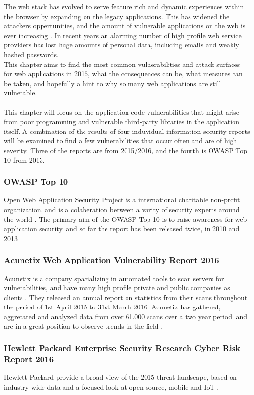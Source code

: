 The web stack has evolved to serve feature rich and dynamic experiences within the browser by expanding on the legacy applications. This has widened the attackers oppertunities, and the amount of vulnerable applications on the web is ever increasing \cite{Acunetix2016}. In recent years an alarming number of high profile web service providers has lost huge amounts of personal data, including emails and weakly hashed passwords. \\ This chapter aims to find the most common vulnerabilities and attack surfaces for web applications in 2016, what the consequences can be, what measures can be taken, and hopefully a hint to why so many web applications are still vulnerable.
\\ \\
This chapter will focus on the application code vulnerabilities that might arise from poor programming and vulnerable third-party libraries in the application itself. A combination of the results of four induvidual information security reports will be examined to find a few vulnerabilities that occur often and are of high severity. Three of the reports are from 2015/2016, and the fourth is OWASP Top 10 from 2013. 
\subsubsection{OWASP Top 10}
Open Web Application Security Project is a international charitable non-profit organization, and is a colaberation between a varity of security experts around the world \cite{OwaspCompany}. The primary aim of the OWASP Top 10 is to raise awareness for web application security, and so far the report has been released twice, in 2010 and 2013 \cite{OwaspTop10Project}.
\subsubsection{Acunetix Web Application Vulnerability Report 2016}
Acunetix is a company spacializing in automated tools to scan servers for vulnerabilities, and have many high profile private and public companies as clients \cite{AcunetixCompany}. They released an annual report on statistics from their scans throughout the period of 1st April 2015 to 31st March 2016. Acunetix has gathered, aggretated and analyzed data from over 61.000 scans over a two year period, and are in a great position to observe trends in the field \cite{Acunetix2016}. 
\subsubsection{Hewlett Packard Enterprise Security Research Cyber Risk Report 2016}
Hewlett Packard provide a broad view of the 2015 threat landscape, based on industry-wide data and a focused look at open source, mobile and IoT \cite{HP2016}.
